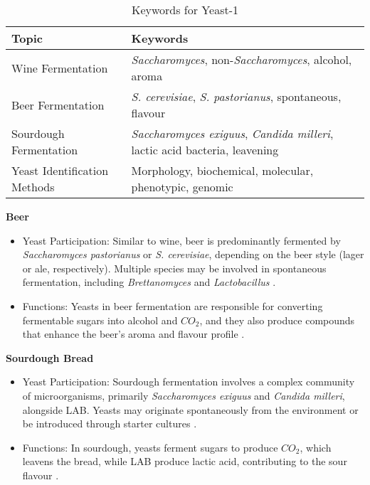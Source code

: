 \begin{table}[h]
    \centering
    \caption{Keywords for Yeast-1} 
    \label{tab:KW-Yeast1}
    \begin{tabular}{l|l}
        \textbf{Topic} & \textbf{Keywords} \\
        \hline
        Wine Fermentation & \textit{Saccharomyces}, non-\textit{Saccharomyces}, alcohol, aroma \\
        Beer Fermentation & \textit{S. cerevisiae}, \textit{S. pastorianus}, spontaneous, flavour \\
        Sourdough Fermentation & \textit{Saccharomyces exiguus}, \textit{Candida milleri}, lactic acid bacteria, leavening \\
        Yeast Identification Methods & Morphology, biochemical, molecular, phenotypic, genomic \\
    \end{tabular}
\end{table}

\vspace*{0.5em}
\textbf{Beer}
\begin{itemize}
    \item Yeast Participation: Similar to wine, beer is predominantly fermented by \textit{Saccharomyces pastorianus} or \textit{S. cerevisiae}, depending on the beer style (lager or ale, respectively). Multiple species may be involved in spontaneous fermentation, including \textit{Brettanomyces} and \textit{Lactobacillus} \cite*{L6-Yeasts, L9-ISAPP}.
    \item Functions: Yeasts in beer fermentation are responsible for converting fermentable sugars into alcohol and $CO_2$, and they also produce compounds that enhance the beer's aroma and flavour profile \cite*{L6-Yeasts, L9-ISAPP}.
\end{itemize}

\vspace*{0.5em}
\textbf{Sourdough Bread}
\begin{itemize}
    \item Yeast Participation: Sourdough fermentation involves a complex community of microorganisms, primarily \textit{Saccharomyces exiguus} and \textit{Candida milleri}, alongside LAB. Yeasts may originate spontaneously from the environment or be introduced through starter cultures \cite*{L6-Yeasts}.
    \item Functions: In sourdough, yeasts ferment sugars to produce $CO_2$, which leavens the bread, while LAB produce lactic acid, contributing to the sour flavour \cite*{L6-Yeasts}.
\end{itemize}

